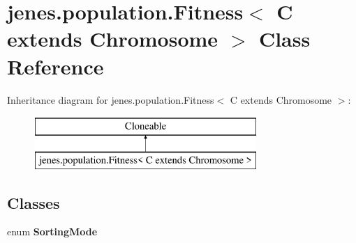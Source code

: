 \hypertarget{classjenes_1_1population_1_1_fitness_3_01_c_01extends_01_chromosome_01_4}{\section{jenes.\-population.\-Fitness$<$ C extends Chromosome $>$ Class Reference}
\label{classjenes_1_1population_1_1_fitness_3_01_c_01extends_01_chromosome_01_4}
}
Inheritance diagram for jenes.\-population.\-Fitness$<$ C extends Chromosome $>$\-:\begin{figure}[H]
\begin{center}
\leavevmode
\includegraphics[height=2.000000cm]{classjenes_1_1population_1_1_fitness_3_01_c_01extends_01_chromosome_01_4}
\end{center}
\end{figure}
\subsection*{Classes}
\begin{DoxyCompactItemize}
\item 
enum {\bfseries Sorting\-Mode}
\end{DoxyCompactItemize}
